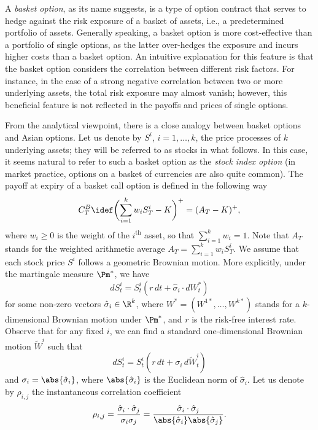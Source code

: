 A \textit{basket option}, as its name suggests, is a type of option contract that serves to hedge against the risk exposure of a basket of assets, i.e., a predetermined portfolio of assets. Generally speaking, a basket option is more cost-effective than a portfolio of single options, as the latter over-hedges the exposure and incurs higher costs than a basket option. An intuitive explanation for this feature is that the basket option considers the correlation between different risk factors. For instance, in the case of a strong negative correlation between two or more underlying assets, the total risk exposure may almost vanish; however, this beneficial feature is not reflected in the payoffs and prices of single options.

From the analytical viewpoint, there is a close analogy between basket options and Asian options. Let us denote by \(S^i\), \(i=1,\dots,k\), the price processes of \(k\) underlying assets; they will be referred to as stocks in what follows. In this case, it seems natural to refer to such a basket option as the \textit{stock index option} (in market practice, options on a basket of currencies are also quite common). The payoff at expiry of a basket call option is defined in the following way
\begin{equation} \label{eq:BasketCallPayoff}
	C_T^B \idef \biggl( \sum_{i=1}^k w_i S_T^i - K \biggr)^+ = (A_T - K)^+,
\end{equation}
where \(w_i \ge 0\) is the weight of the \(i^{\text{th}}\) asset, so that \(\sum_{i=1}^k w_i = 1\). Note that \(A_T\) stands for the weighted arithmetic average \(A_T = \sum_{i=1}^k w_i S_T^i\). We assume that each stock price \(S^i\) follows a geometric Brownian motion. More explicitly, under the martingale measure \(\Pm^*\), we have
\begin{equation} \label{eq:StockDynamicsVector}
	dS_t^i = S_t^i (r \, dt + \hat{\sigma}_i \cdot dW_t^*)
\end{equation}
for some non-zero vectors \(\hat{\sigma}_i \in \R^k\), where \(W^* = (W^{1*}, \dots, W^{k*})\) stands for a \(k\)-dimensional Brownian motion under \(\Pm^*\), and \(r\) is the risk-free interest rate. Observe that for any fixed \(i\), we can find a standard one-dimensional Brownian motion \(\tilde{W}^i\) such that
\begin{equation} \label{eq:StockDynamicsScalar}
	dS_t^i = S_t^i (r \, dt + \sigma_i \, d\tilde{W}_t^i)
\end{equation}
and \(\sigma_i = \abs{\hat{\sigma}_i}\), where \(\abs{\hat{\sigma}_i}\) is the Euclidean norm of \(\hat{\sigma}_i\). Let us denote by \(\rho_{i,j}\) the instantaneous correlation coefficient
\[
	\rho_{i,j} = \frac{\hat{\sigma}_i \cdot \hat{\sigma}_j}{\sigma_i \sigma_j} = \frac{\hat{\sigma}_i \cdot \hat{\sigma}_j}{\abs{\hat{\sigma}_i} \abs{\hat{\sigma}_j}}.
\]


